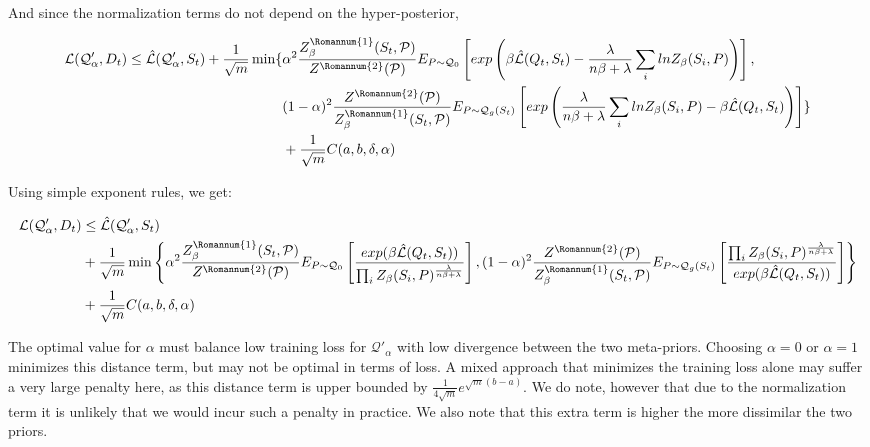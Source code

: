 \documentclass[letterpaper]{article}
\theoremstyle{definition}
\begin{document}
And since the normalization terms do not depend on the hyper-posterior,

\begin{equation*}
\begin{split}
\mathcal{L}(\mathcal{Q}'_\alpha, D_t) \leq  \hat{\mathcal{L}}(\mathcal{Q}'_\alpha, S_t) + \frac{1}{\sqrt{m}}\min \{ &\alpha^2 \frac{Z^{\text{\Romannum{1}}}_\beta(S_t, \mathcal{P})}{Z^{\text{\Romannum{2}}}(\mathcal{P})}  E_{P\sim \mathcal{Q}_0}\left [  exp\left ( \beta \hat{\mathcal{L}}(Q_t, S_t)-\frac{\lambda}{n\beta+\lambda}\sum_i lnZ_\beta(S_i,P) \right ) \right ],\\ &(1-\alpha)^2 \frac{Z^{\text{\Romannum{2}}}(\mathcal{P})}{Z^{\text{\Romannum{1}}}_\beta(S_t, \mathcal{P})} E_{P\sim \mathcal{Q}_{g}(S_t)}\left [   exp\left ( \frac{\lambda}{n\beta+\lambda}\sum_i lnZ_\beta(S_i,P)-\beta \hat{\mathcal{L}}(Q_t, S_t) \right ) \right ]  \}\\&+ \frac{1}{\sqrt{m}}C(a,b,\delta, \alpha)
\end{split}
\end{equation*}

Using simple exponent rules, we get:

\begin{equation*}
\begin{split}
\mathcal{L}(\mathcal{Q}'_\alpha, D_t) &\leq  \hat{\mathcal{L}}(\mathcal{Q}'_\alpha, S_t) \\&+ \frac{1}{\sqrt{m}}\min \left \{ \alpha^2 \frac{Z^{\text{\Romannum{1}}}_\beta(S_t, \mathcal{P})}{Z^{\text{\Romannum{2}}}(\mathcal{P})}  E_{P\sim \mathcal{Q}_0}\left [  \frac{exp( \beta \hat{\mathcal{L}}(Q_t, S_t))}{\prod_i Z_\beta(S_i,P)^{\frac{\lambda}{n\beta+\lambda}}} \right ],(1-\alpha)^2 \frac{Z^{\text{\Romannum{2}}}(\mathcal{P})}{Z^{\text{\Romannum{1}}}_\beta(S_t, \mathcal{P})} E_{P\sim \mathcal{Q}_{g}(S_t)}\left [  \frac{\prod_i Z_\beta(S_i,P)^{\frac{\lambda}{n\beta+\lambda}}}{exp(\beta \hat{\mathcal{L}}(Q_t, S_t))} \right ] \right \}\\&+ \frac{1}{\sqrt{m}}C(a,b,\delta, \alpha)
\end{split}
\end{equation*}

The optimal value for $\alpha$ must balance low training loss for $\mathcal{Q}'_\alpha$ with low divergence between the two meta-priors. Choosing $\alpha=0$ or $\alpha=1$ minimizes this distance term, but may not be optimal in terms of loss. A mixed approach that minimizes the training loss alone may suffer a very large penalty here, as this distance term is upper bounded by $\frac{1}{4\sqrt{m}}e^{\sqrt{m}(b-a)}$. We do note, however that due to the normalization term it is unlikely that we would incur such a penalty in practice. We also note that this extra term is higher the more dissimilar the two priors. 
\end{document}
